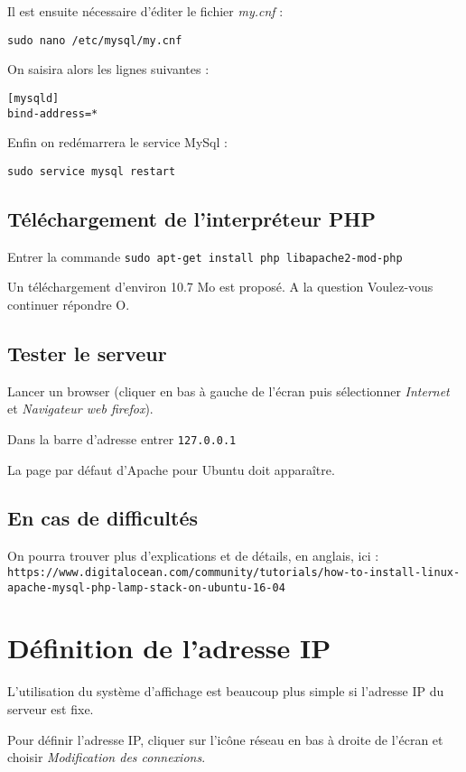 \documentclass[a4paper]{ffco-rapport}
\begin{document}
		Il est ensuite nécessaire d'éditer le fichier \emph{my.cnf} :

	
		\verb|sudo nano /etc/mysql/my.cnf|
		
		On saisira alors les lignes suivantes :

			\begin{verbatim}
[mysqld]
bind-address=*
			\end{verbatim}
			
		Enfin on redémarrera le service MySql :
		
		\verb|sudo service mysql restart|

	\subsection{Téléchargement de l'interpréteur PHP}

		Entrer la commande \verb|sudo apt-get install php libapache2-mod-php|

		Un téléchargement d'environ 10.7 Mo est proposé. A la question \og{}Voulez-vous continuer\fg{} répondre O.
		
	\subsection{Tester le serveur}
		Lancer un browser (cliquer en bas à gauche de l'écran puis sélectionner \emph{Internet} et \emph{Navigateur web firefox}).
		
		Dans la barre d'adresse entrer \verb|127.0.0.1|
		
		La page par défaut d'Apache pour Ubuntu doit apparaître.

	\subsection{En cas de difficultés}
	
	On pourra trouver plus d'explications et de détails, en anglais, ici :\newline
	\scriptsize{\verb|https://www.digitalocean.com/community/tutorials/how-to-install-linux-apache-mysql-php-lamp-stack-on-ubuntu-16-04|}
	\normalsize

\section{Définition de l'adresse IP}
	L'utilisation du système d'affichage est beaucoup plus simple si l'adresse IP du serveur est fixe.
	
	Pour définir l'adresse IP, cliquer sur l’icône réseau en bas à droite de l'écran et choisir \emph{Modification des connexions}.
	
\end{document}

